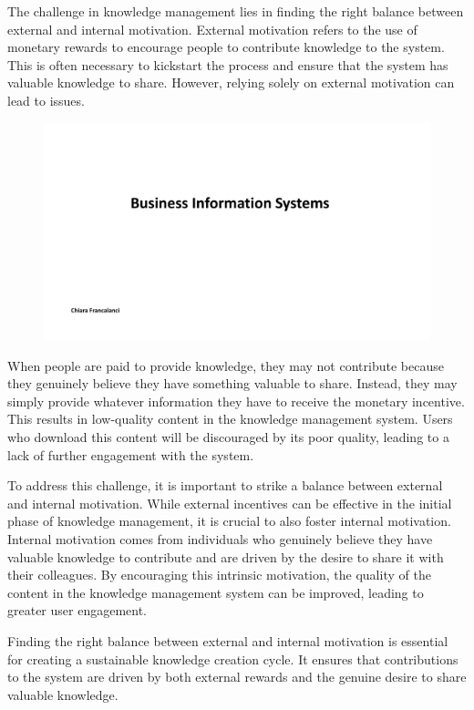 The challenge in knowledge management lies in finding the right balance
between external and internal motivation. External motivation refers to
the use of monetary rewards to encourage people to contribute knowledge
to the system. This is often necessary to kickstart the process and
ensure that the system has valuable knowledge to share. However, relying
solely on external motivation can lead to issues.

\begin{figure}[!h]
    \centering
    \includegraphics[page=20, trim = 1.5cm 4.7cm 1.5cm 4cm, clip, width=\textwidth]{images/05 - KM.pdf}
\end{figure}

When people are paid to provide knowledge, they may not contribute
because they genuinely believe they have something valuable to share.
Instead, they may simply provide whatever information they have to
receive the monetary incentive. This results in low-quality content in
the knowledge management system. Users who download this content will be
discouraged by its poor quality, leading to a lack of further engagement
with the system.

To address this challenge, it is important to strike a balance between
external and internal motivation. While external incentives can be
effective in the initial phase of knowledge management, it is crucial to
also foster internal motivation. Internal motivation comes from
individuals who genuinely believe they have valuable knowledge to
contribute and are driven by the desire to share it with their
colleagues. By encouraging this intrinsic motivation, the quality of the
content in the knowledge management system can be improved, leading to
greater user engagement.

Finding the right balance between external and internal motivation is
essential for creating a sustainable knowledge creation cycle. It
ensures that contributions to the system are driven by both external
rewards and the genuine desire to share valuable knowledge.

